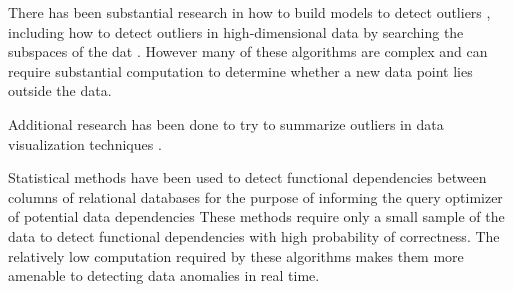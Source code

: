 
There has been substantial research in how to build models to detect outliers \cite{Aggarwal2013}, including how to detect outliers in high-dimensional data by searching the subspaces of the dat \cite{Zhang2004}\cite{Kriegel2009}.
However many of these algorithms are complex and can require substantial computation to determine whether a new data point lies outside the data.

Additional research has been done to try to summarize outliers in data visualization techniques \cite{Wu}.

Statistical methods have been used to detect functional dependencies between columns of relational databases for the purpose of informing the query optimizer of potential data dependencies \cite{Ilyas2004} 
These methods require only a small sample of the data to detect functional dependencies with high probability of correctness.
The relatively low computation required by these algorithms makes them more amenable to detecting data anomalies in real time.



